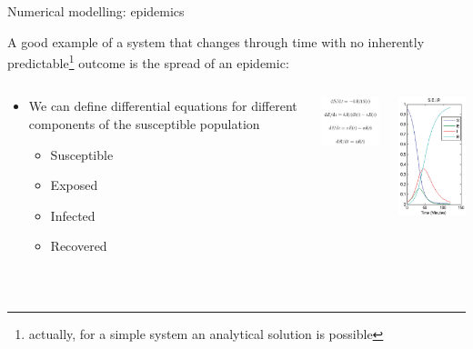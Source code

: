 \begin{frame}{\insertsectionnumber{ |} Numerical modelling: epidemics}

A good example of a system that changes through time with no inherently predictable\footnote{actually, for a simple system an analytical solution is possible}  outcome is the spread of an epidemic:

\begin{columns}

\hspace*{1cm}\column[c]{4.5cm}

\vspace*{0.5cm}\begin{beamerboxesrounded}[lower=gray,shadow=true]{

\begin{itemize}
\item We can define differential equations for different components of the susceptible population
\begin{itemize}
\item Susceptible
\item Exposed
\item Infected
\item Recovered
\end{itemize}
\end{itemize}
}
\end{beamerboxesrounded}

\begin{beamerboxesrounded}[lower=gray,shadow=true]{
\centering\includegraphics[width=3cm]{images/SEIR_eqs.png}\\

}
\end{beamerboxesrounded}



\hspace*{1cm}\column[c]{3.5cm}
\includegraphics[width=3.5cm]{images/SEIR_plot.png}
\end{columns}

\vspace*{0.5cm}\\


\end{frame}



